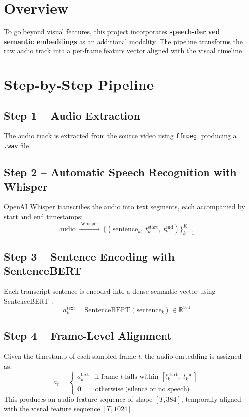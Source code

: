 \documentclass[12pt, a4paper]{report}
\begin{document}
\section{Overview}

To go beyond visual features, this project incorporates \textbf{speech-derived
semantic embeddings} as an additional modality. The pipeline transforms the raw
audio track into a per-frame feature vector aligned with the visual timeline.

\section{Step-by-Step Pipeline}

\subsection{Step 1 -- Audio Extraction}
The audio track is extracted from the source video using \texttt{ffmpeg}, producing
a \texttt{.wav} file.

\subsection{Step 2 -- Automatic Speech Recognition with Whisper}
OpenAI Whisper \cite{radford2023} transcribes the audio into text segments, each
accompanied by start and end timestamps:
\begin{equation*}
  \text{audio} \;\xrightarrow{\;\text{Whisper}\;}\;
  \bigl\{(\text{sentence}_k,\; t^{\text{start}}_k,\; t^{\text{end}}_k)\bigr\}_{k=1}^{K}
\end{equation*}

\subsection{Step 3 -- Sentence Encoding with SentenceBERT}
Each transcript sentence is encoded into a dense semantic vector using
SentenceBERT \cite{reimers2019}:
\begin{equation}
  a^{\text{text}}_k = \mathrm{SentenceBERT}(\text{sentence}_k) \in \mathbb{R}^{384}
\end{equation}

\subsection{Step 4 -- Frame-Level Alignment}
Given the timestamp of each sampled frame $t$, the audio embedding is assigned as:
\begin{equation}
  a_t =
  \begin{cases}
    a^{\text{text}}_k & \text{if frame } t \text{ falls within }
                          [t^{\text{start}}_k,\; t^{\text{end}}_k] \\[4pt]
    \mathbf{0}        & \text{otherwise (silence or no speech)}
  \end{cases}
\end{equation}
This produces an audio feature sequence of shape $[T, 384]$, temporally aligned
with the visual feature sequence $[T, 1024]$.
\end{document}
